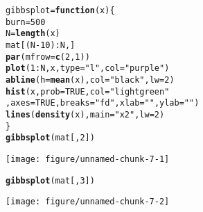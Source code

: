 \documentclass{article}\usepackage[]{graphicx}\usepackage[]{color}
\makeatletter
\def\maxwidth{ %
  \ifdim\Gin@nat@width>\linewidth
    \linewidth
  \else
    \Gin@nat@width
  \fi
}
\newcommand{\hlnum}[1]{\textcolor[rgb]{0.686,0.059,0.569}{#1}}%
\newcommand{\hlstr}[1]{\textcolor[rgb]{0.192,0.494,0.8}{#1}}%
\newcommand{\hlopt}[1]{\textcolor[rgb]{0,0,0}{#1}}%
\newcommand{\hlstd}[1]{\textcolor[rgb]{0.345,0.345,0.345}{#1}}%
\newcommand{\hlkwa}[1]{\textcolor[rgb]{0.161,0.373,0.58}{\textbf{#1}}}%
\newcommand{\hlkwb}[1]{\textcolor[rgb]{0.69,0.353,0.396}{#1}}%
\newcommand{\hlkwc}[1]{\textcolor[rgb]{0.333,0.667,0.333}{#1}}%
\newcommand{\hlkwd}[1]{\textcolor[rgb]{0.737,0.353,0.396}{\textbf{#1}}}%
\newenvironment{kframe}{%
 \def\at@end@of@kframe{}%
 \ifinner\ifhmode%
  \def\at@end@of@kframe{\end{minipage}}%
  \begin{minipage}{\columnwidth}%
 \fi\fi%
 \def\FrameCommand##1{\hskip\@totalleftmargin \hskip-\fboxsep
 \colorbox{shadecolor}{##1}\hskip-\fboxsep
     \hskip-\linewidth \hskip-\@totalleftmargin \hskip\columnwidth}%
 \MakeFramed {\advance\hsize-\width
   \@totalleftmargin\z@ \linewidth\hsize
   \@setminipage}}%
 {\par\unskip\endMakeFramed%
 \at@end@of@kframe}
\newenvironment{knitrout}{}{} %
\makeatother
\begin{document}
\begin{knitrout}
\begin{kframe}
\begin{alltt}
\hlstd{gibbsplot}\hlkwb{=}\hlkwa{function}\hlstd{(}\hlkwc{x}\hlstd{)\{}
  \hlstd{burn}\hlkwb{=}\hlnum{500}
  \hlstd{N}\hlkwb{=}\hlkwd{length}\hlstd{(x)}
  \hlstd{mat[(N}\hlopt{-}\hlnum{10}\hlstd{)}\hlopt{:}\hlstd{N,]}
  \hlkwd{par}\hlstd{(}\hlkwc{mfrow}\hlstd{=}\hlkwd{c}\hlstd{(}\hlnum{2}\hlstd{,}\hlnum{1}\hlstd{))}
  \hlkwd{plot}\hlstd{(}\hlnum{1}\hlopt{:}\hlstd{N,x,} \hlkwc{type}\hlstd{=}\hlstr{"l"}\hlstd{,} \hlkwc{col}\hlstd{=}\hlstr{"purple"}\hlstd{)}
  \hlkwd{abline}\hlstd{(}\hlkwc{h}\hlstd{=}\hlkwd{mean}\hlstd{(x),}\hlkwc{col}\hlstd{=}\hlstr{"black"}\hlstd{,}\hlkwc{lw}\hlstd{=}\hlnum{2}\hlstd{)}
  \hlkwd{hist}\hlstd{(x,}\hlkwc{prob}\hlstd{=}\hlnum{TRUE}\hlstd{,}\hlkwc{col}\hlstd{=}\hlstr{"lightgreen"}
       \hlstd{,}\hlkwc{axes}\hlstd{=}\hlnum{TRUE}\hlstd{,}\hlkwc{breaks} \hlstd{=} \hlstr{"fd"}\hlstd{,}\hlkwc{xlab}\hlstd{=}\hlstr{""}\hlstd{,}\hlkwc{ylab}\hlstd{=}\hlstr{""}\hlstd{)}
  \hlkwd{lines}\hlstd{(}\hlkwd{density}\hlstd{(x),}\hlkwc{main}\hlstd{=}\hlstr{"x2"}\hlstd{,}\hlkwc{lw}\hlstd{=}\hlnum{2}\hlstd{)}
\hlstd{\}}
\hlkwd{gibbsplot}\hlstd{(mat[,}\hlnum{2}\hlstd{])}
\end{alltt}
\end{kframe}
\texttt{[image: figure/unnamed-chunk-7-1]} 
\begin{kframe}\begin{alltt}
\hlkwd{gibbsplot}\hlstd{(mat[,}\hlnum{3}\hlstd{])}
\end{alltt}
\end{kframe}
\texttt{[image: figure/unnamed-chunk-7-2]} 

\end{knitrout}
\end{document}

